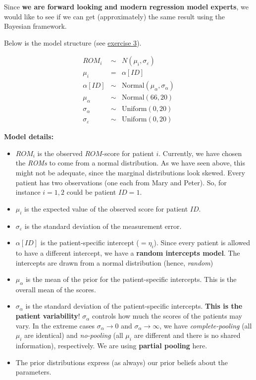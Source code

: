 \documentclass[
]{book}
\providecommand{\tightlist}{%
  \setlength{\itemsep}{0pt}\setlength{\parskip}{0pt}}
\begin{document}
Since \textbf{we are forward looking and modern regression model experts},
we would like to see if we can get (approximately) the same result using the Bayesian
framework.

Below is the model structure (see \hyperref[exercise3]{exercise 3}).

\[
\begin{array}{rcl}
ROM_i &\sim& N(\mu_i, \sigma_{\varepsilon}) \\
\mu_i &=& \alpha[ID] \\
\alpha[ID] &\sim& \text{Normal}(\mu_{\alpha}, \sigma_{\alpha}) \\
\mu_{\alpha} &\sim& \text{Normal}(66, 20) \\
\sigma_{\alpha} &\sim& \text{Uniform}(0,20) \\
\sigma_{\varepsilon} &\sim& \text{Uniform}(0,20)
\end{array}
\]

\textbf{Model details:}

\begin{itemize}
\tightlist
\item
  \(ROM_i\) is the observed \(ROM\)-score for patient \(i\). Currently, we have chosen the \emph{ROMs} to
  come from a normal distribution. As we have seen above, this might not be adequate,
  since the marginal distributions look skewed.
  Every patient has two observations (one each from Mary and Peter).
  So, for instance \(i=1,2\) could be patient \(ID=1\).
\item
  \(\mu_i\) is the expected value of the observed score for patient \(ID\).
\item
  \(\sigma_{\varepsilon}\) is the standard deviation of the measurement error.
\item
  \(\alpha[ID]\) is the patient-specific intercept (\(=\eta_i\)).
  Since every patient is allowed to have a different intercept,
  we have a \textbf{random intercepts model}.
  The intercepts are drawn from a normal distribution (hence, \emph{random})
\item
  \(\mu_{\alpha}\) is the mean of the prior for the patient-specific intercepts.
  This is the overall mean of the scores.
\item
  \(\sigma_{\alpha}\) is the standard deviation of the patient-specific intercepts.
  \textbf{This is the patient variability}! \(\sigma_{\alpha}\) controls how much
  the scores of the patients may vary.
  In the extreme cases \(\sigma_{\alpha} \rightarrow 0\) and \(\sigma_{\alpha} \rightarrow \infty\),
  we have \emph{complete-pooling} (all \(\mu_i\) are identical) and \emph{no-pooling}
  (all \(\mu_i\) are different and there is no shared information), respectively.
  We are using \textbf{partial pooling} here.
\item
  The prior distributions express (as always) our prior beliefs about the parameters.
\end{itemize}
\end{document}
